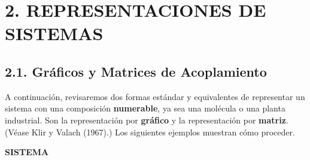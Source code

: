 {\section*{\textbf{2. REPRESENTACIONES DE SISTEMAS}}

\subsection*{2.1. Gráficos y Matrices de Acoplamiento}
A continuación, revisaremos dos formas estándar y equivalentes de representar un sistema con una composición \textbf{numerable}, ya sea una molécula o una planta industrial. Son la representación por \textbf{gráfico} y la representación por \textbf{matriz}. (Véase Klir y Valach (1967).) Los siguientes ejemplos muestran cómo proceder.
}
\newpage
\fancyhf{}
\fancyhead[r]{\thepage} 
\begin{center}
{\fontsize{16}{18}\selectfont \textbf{SISTEMA}}
\end{center}
\vspace{0.5cm}

